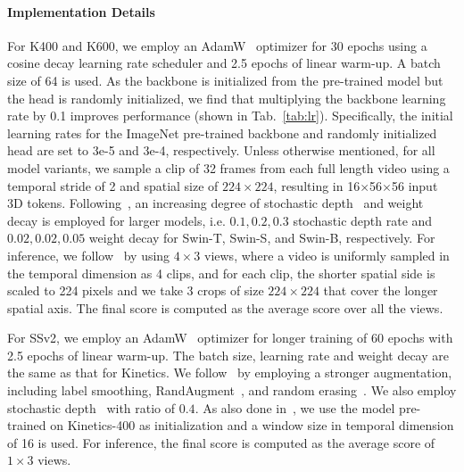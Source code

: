 \documentclass{article}
\begin{document}
\paragraph{Implementation Details}
For K400 and K600, we employ an AdamW~\cite{kingma2014adam} optimizer for 30 epochs using a cosine decay learning rate scheduler and 2.5 epochs of linear warm-up. A batch size of 64 is used. As the backbone is initialized from the pre-trained model but the head is randomly initialized, we find that multiplying the backbone learning rate by 0.1 improves performance (shown in Tab.~\ref{tab:lr}). 
Specifically, the initial learning rates for the ImageNet pre-trained backbone and randomly initialized head are set to 3e-5 and 3e-4, respectively.
Unless otherwise mentioned, for all model variants, we sample a clip of 32 frames from each full length video using a temporal stride of 2 and spatial size of $224\times224$, resulting in 16$\times$56$\times$56 input 3D tokens.
Following~\cite{liu2021swin}, an increasing degree of stochastic depth~\cite{huang2016deep} and weight decay is employed for larger models, i.e. $0.1, 0.2, 0.3$ stochastic depth rate and $0.02, 0.02, 0.05$ weight decay for Swin-T, Swin-S, and Swin-B, respectively.
For inference, we follow~\cite{arnab2021vivit} by using $4\times3$ views, where a video is uniformly sampled in the temporal dimension as 4 clips, and for each clip, the shorter spatial side is scaled to 224 pixels and we take 3 crops of size $224\times224$ that cover the longer spatial axis. The final score is computed as the average score over all the views.

For SSv2, we employ an AdamW~\cite{kingma2014adam} optimizer for longer training of 60 epochs with 2.5 epochs of linear warm-up. The batch size, learning rate and weight decay are the same as that for Kinetics. We follow~\cite{mvit2021} by employing a stronger augmentation, including label smoothing, RandAugment~\cite{cubuk2020randaugment}, and random erasing~\cite{zhong2020random}. We also employ stochastic depth~\cite{huang2016deep} with ratio of $0.4$. As also done in~\cite{mvit2021}, we use the model pre-trained on Kinetics-400 as initialization and a window size in temporal dimension of 16 is used. For inference, the final score is computed as the average score of $1\times3$ views.
\end{document}
